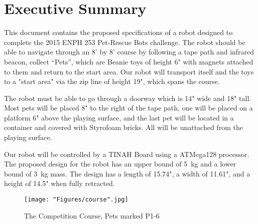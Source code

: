 \documentclass[11pt, oneside]{article} %
\begin{document}
\section*{Executive Summary}
This document contains the proposed specifications of a robot designed to complete the 2015 ENPH 253 Pet-Rescue Bots challenge. The robot should be able to navigate through an 8' by 8' course by following a tape path and infrared beacon, collect ``Pets'', which are Beanie toys of height 6" with magnets attached to them and return to the start area. Our robot will transport itself and the toys to a "start area" via the zip line of height 19", which spans the course.

The robot must be able to go through a doorway which is 14" wide and 18" tall. Most pets will be placed 8" to the right of the tape path, one will be placed on a platform 6" above the playing surface, and the last pet will be located in a container and covered with Styrofoam bricks. All will be unattached from the playing surface.

Our robot will be controlled by a TINAH Board using a ATMega128 processor. The proposed design for the robot has an upper bound of 5~kg and a lower bound of 3~kg mass. The design has a length of 15.74", a width of 11.61", and a height of 14.5" when fully retracted.

\begin{figure*}[h]
	\centering
	\texttt{[image: "Figures/course".jpg]}
	\caption{The Competition Course, Pets marked P1-6}
\end{figure*}

\newpage


\tableofcontents %
\listoffigures %
\listoftables %


\newpage
\end{document}
